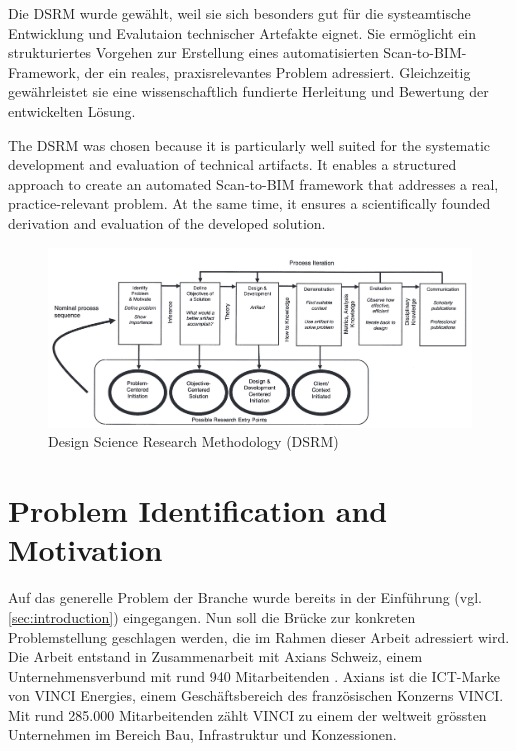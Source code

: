\begin{German}
    Die DSRM wurde gewählt, weil sie sich besonders gut für die systeamtische Entwicklung und Evalutaion technischer Artefakte eignet. Sie ermöglicht ein strukturiertes Vorgehen zur Erstellung eines automatisierten Scan-to-BIM-Framework, der ein reales, praxisrelevantes Problem adressiert. Gleichzeitig gewährleistet sie eine wissenschaftlich fundierte Herleitung und Bewertung der entwickelten Lösung.
\end{German}

\begin{English}
    The DSRM was chosen because it is particularly well suited for the systematic development and evaluation of technical artifacts. It enables a structured approach to create an automated Scan-to-BIM framework that addresses a real, practice-relevant problem. At the same time, it ensures a scientifically founded derivation and evaluation of the developed solution.
\end{English}
    
\begin{figure}[h]
    \centering
    \includegraphics[width=1\textwidth]{images/DSR.png}
    \caption{Design Science Research Methodology (DSRM) \cite{peffersPDFDesignScience2024}}
    \label{fig:DSR}
\end{figure}

\section{Problem Identification and Motivation}
\label{sec:problem_identification}
\begin{German}
    Auf das generelle Problem der Branche wurde bereits in der Einführung (vgl. \ref{sec:introduction}) eingegangen. Nun soll die Brücke zur konkreten Problemstellung geschlagen werden, die im Rahmen dieser Arbeit adressiert wird. Die Arbeit entstand in Zusammenarbeit mit Axians Schweiz, einem Unternehmensverbund mit rund 940 Mitarbeitenden \cite{AxiansSchweiz}. Axians ist die ICT-Marke von VINCI Energies, einem Geschäftsbereich des französischen Konzerns VINCI. Mit rund 285.000 Mitarbeitenden \cite{VINCI2025} zählt VINCI zu einem der weltweit grössten Unternehmen im Bereich Bau, Infrastruktur und Konzessionen.
\end{German}
    
